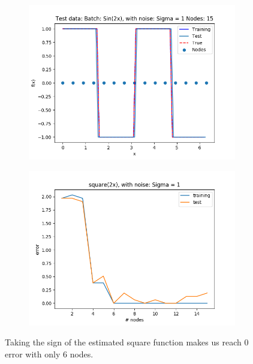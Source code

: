 \documentclass{article}
\begin{document}
\begin{figure}[ht!]
    \centering
    \begin{subfigure}[t]{0.4\textwidth}
        \centering
        \includegraphics[width=1\textwidth]{plots/batch/best_square_cheat.png}
        \caption{}
    \end{subfigure}
    \begin{subfigure}[t]{0.4\textwidth}
        \centering
        \includegraphics[width=1\textwidth]{plots/batch/square_error_sign}
        \caption{}
    \end{subfigure}
    \caption{Taking the sign of the estimated square function makes us reach 0 error with only 6 nodes.}
\end{figure}
\end{document}
